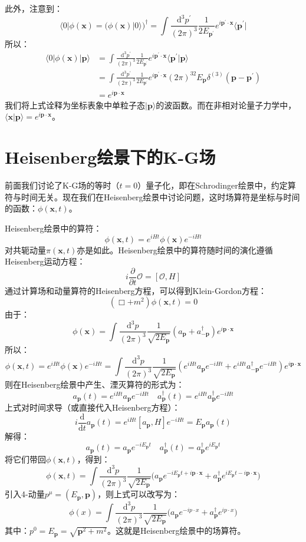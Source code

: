 \documentclass{book}
\begin{document}
此外，注意到：
$$
\langle0|\phi(\mathbf{x})=(\phi(\mathbf{x})|0\rangle)^\dagger=\int\frac{\mathrm{d}^3 p^\prime}{(2\pi)^3}\frac{1}{2E_{\mathbf{p}^\prime}}e^{i\mathbf{p}^\prime\cdot\mathbf{x}}\langle\mathbf{p^\prime}|
$$
所以：
$$
\begin{aligned}
\langle0|\phi(\mathbf{x})|\mathbf{p}\rangle&=\int\frac{\mathrm{d}^3 p^\prime}{(2\pi)^3}\frac{1}{2E_{\mathbf{p}^\prime}}e^{i\mathbf{p}^\prime\cdot\mathbf{x}}\langle\mathbf{p^\prime}|\mathbf{p}\rangle \\&=\int\frac{\mathrm{d}^3 p^\prime}{(2\pi)^3}\frac{1}{2E_{\mathbf{p}^\prime}}e^{i\mathbf{p}^\prime\cdot\mathbf{x}}(2\pi)^32E_{\mathbf{p}}\delta^{(3)}(\mathbf{p}-\mathbf{p}^\prime)\\&=e^{i\mathbf{p}\cdot\mathbf{x}}
\end{aligned}
$$
我们将上式诠释为坐标表象中单粒子态$|\mathbf{p}\rangle$的波函数。而在非相对论量子力学中，$\langle\mathbf{x}|\mathbf{p}\rangle=e^{i\mathbf{p}\cdot\mathbf{x}}$。
\section{Heisenberg绘景下的K-G场}
前面我们讨论了K-G场的等时（$t=0$）量子化，即在Schrodinger绘景中，约定算符与时间无关。现在我们在Heisenberg绘景中讨论问题，这时场算符是坐标与时间的函数：$\phi(\mathbf{x},t)$。

Heisenberg绘景中的算符：
$$
\phi(\mathbf{x},t)=e^{iHt}\phi(\mathbf{x})e^{-iHt}
$$
对共轭动量$\pi(\mathbf{x},t)$亦是如此。Heisenberg绘景中的算符随时间的演化遵循Heisenberg运动方程：
$$
i\frac\partial{\partial t}{\mathcal{O}}=[\mathcal{O},H]
$$
通过计算场和动量算符的Heisenberg方程，可以得到Klein-Gordon方程：
$$
(\Box+m^2)\phi(\mathbf{x},t)=0
$$
由于：
$$
\phi(\mathbf{x})=\int\frac{\mathrm{d}^3p}{(2\pi)^3}\frac{1}{\sqrt{2E_{\mathbf{p}}}}(a_\mathbf{p}+a_{-\mathbf{p}}^\dagger)e^{i\mathbf{p}\cdot\mathbf{x}}
$$
所以：
$$
\phi(\mathbf{x},t)=e^{iHt}\phi(\mathbf{x})e^{-iHt}=\int\frac{\mathrm{d}^3p}{(2\pi)^3}\frac{1}{\sqrt{2E_{\mathbf{p}}}}(e^{iHt}a_\mathbf{p}e^{-iHt}+e^{iHt}a_{-\mathbf{p}}^\dagger e^{-iHt})e^{i\mathbf{p}\cdot\mathbf{x}}
$$
则在Heisenberg绘景中产生、湮灭算符的形式为：
$$
a_{\mathbf{p}}\left({t}\right)=e^{iHt}a_{\mathbf{p}}e^{-iHt}\quad a_{\mathbf{p}}^{\dagger}({t})=e^{iHt}a_{\mathbf{p}}^{\dagger}e^{-iHt}
$$
上式对时间求导（或直接代入Heisenberg方程）：
$$
i\frac{\mathrm{d}}{\mathrm{d}t}a_{\mathbf{p}}(t)=e^{iHt}[a_\mathbf{p},H]e^{-iHt}=E_\mathbf{p}a_\mathbf{p}(t)
$$
解得：
$$
a_{\mathbf{p}}(t)=a_\mathbf{p}e^{-iE_\mathbf{p}t} \quad a_{\mathbf{p}}^\dagger(t)=a_\mathbf{p}^\dagger e^{iE_\mathbf{p}t}
$$
将它们带回$\phi(\mathbf{x},t)$，得到：
$$
\phi(\mathbf{x},t)=\int\frac{\mathrm{d}^3p}{(2\pi)^3}\frac{1}{\sqrt{2E_{\mathbf{p}}}}\biggl(a_{\mathbf{p}}e^{-iE_{\mathbf{p}}t+i\mathbf{p}\cdot\mathbf{x}}+a_{\mathbf{p}}^{\dagger}e^{iE_{\mathbf{p}}t-i\mathbf{p}\cdot\mathbf{x}}\biggr)
$$
引入4-动量$p^\mu=(E_\mathbf{p},\mathbf{p})$，则上式可以改写为：
$$
\phi(x)=\int\frac{\mathrm{d}^3p}{(2\pi)^3}\frac{1}{\sqrt{2E_{\mathbf{p}}}}\biggl(a_{\mathbf{p}}e^{-ip\cdot x}+a_{\mathbf{p}}^{\dagger}e^{ip\cdot x}\biggr)
$$
其中：$p^0=E_{\mathbf{p}}=\sqrt{\mathbf{p}^2+m^2}$。这就是Heisenberg绘景中的场算符。
\end{document}
